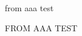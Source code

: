 \documentclass{article}
\newcommand\aaa[1]{%
		\newcommand\bbb[1]{#1 ##1}%
	}
\def\AAA#1{%
		\def\BBB##1{#1 ##1}%
	}
\begin{document}
\aaa{from aaa}
\bbb{test}

\AAA{FROM AAA}
\BBB{TEST}
\end{document}
